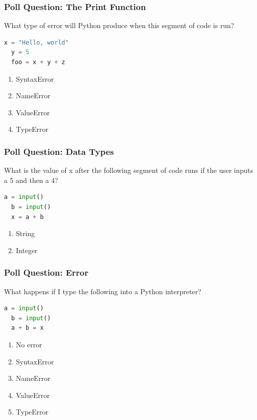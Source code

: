 \documentclass{beamer}
\begin{document}
%
%
%
\begin{frame}[fragile]
  \frametitle{Poll Question: The Print Function}
  What type of error will Python produce when this segment of code is run?
  \begin{lstlisting}[language=Python]
  x = "Hello, world"
  y = 5
  foo = x + y + z\end{lstlisting}
  \begin{enumerate}
    \item SyntaxError
    \item NameError
    \item ValueError
    \item TypeError
  \end{enumerate}
\end{frame}

%
%
%
\begin{frame}[fragile]
  \frametitle{Poll Question: Data Types}
  What is the value of x after the following segment of code runs if the user inputs a 5 and then a 4?
  \begin{lstlisting}[language=Python]
  a = input()
  b = input()
  x = a + b\end{lstlisting}
  \begin{enumerate}
    \item String
    \item Integer
  \end{enumerate}
\end{frame}

%
%
%
\begin{frame}[fragile]
  \frametitle{Poll Question: Error}
  What happens if I type the following into a Python interpreter?
  \begin{lstlisting}[language=Python]
  a = input()
  b = input()
  a + b = x \end{lstlisting}
  \begin{enumerate}
    \item No error
    \item SyntaxError
    \item NameError
    \item ValueError
    \item TypeError
  \end{enumerate}
\end{frame}
\end{document}
